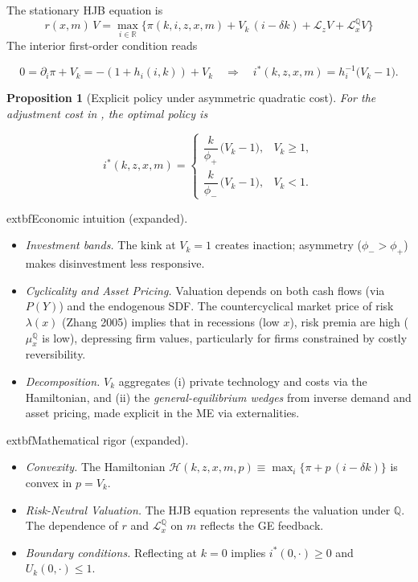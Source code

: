 \documentclass[11pt,letterpaper,oneside]{article}
\providecommand{\ac}[1]{#1}%
\newtheorem{propositionT}{Proposition}
\newenvironment{proposition}[2]{\begin{propositionT}[#1]\label{prop:#2}}{\end{propositionT}}
\newcommand{\R}{\mathbb{R}}
\newcommand{\Lz}{\mathcal{L}_z}
\newcommand{\LxQ}{\mathcal{L}_x^{\mathbb{Q}}}
\newcommand{\muxQ}{\mu_x^{\mathbb{Q}}}
\begin{document}
The stationary \ac{HJB} equation is
\begin{equation}
\boxed{\; r(x,m)\,V
  = \max_{i\in\R} \Big\{ \pi(k,i,z,x,m) + V_k\,(i-\delta k) + \Lz V + \LxQ V \Big\} \;}
\tag{HJB}\label{eq:HJB}
\end{equation}
The interior first-order condition reads

$$
0=\partial_i\pi+V_k=-(1+h_i(i,k))+V_k
\quad\Longrightarrow\quad
i^*(k,z,x,m)=h_i^{-1}\!\big(V_k-1\big).
$$

\begin{proposition}{Explicit policy under asymmetric quadratic cost}{policy}
For the adjustment cost in , the optimal policy is

$$
i^*(k,z,x,m)=
\begin{cases}
\dfrac{k}{\phi_+}\,\big(V_k-1\big), & V_k\ge 1,\\[6pt]
\dfrac{k}{\phi_-}\,\big(V_k-1\big), & V_k< 1.
\end{cases}
$$
\end{proposition}

\begin{tcolorbox}[didacticstyle]
      extbf{Economic intuition (expanded).}
\begin{itemize}[leftmargin=1.15em,itemsep=0.25em]
  \item \emph{Investment bands.} The kink at $V_k=1$ creates inaction; asymmetry ($\phi_->\phi_+$) makes disinvestment less responsive.
  \item \emph{Cyclicality and Asset Pricing.} Valuation depends on both cash flows (via $P(Y)$) and the endogenous SDF. The countercyclical market price of risk $\lambda(x)$ (Zhang 2005) implies that in recessions (low $x$), risk premia are high ($\muxQ$ is low), depressing firm values, particularly for firms constrained by costly reversibility.
  \item \emph{Decomposition.} $V_k$ aggregates (i) private technology and costs via the Hamiltonian, and (ii) the \emph{general-equilibrium wedges} from inverse demand and asset pricing, made explicit in the ME via externalities.
\end{itemize}
\end{tcolorbox}

\begin{tcolorbox}[mathstyle]
      extbf{Mathematical rigor (expanded).}
\begin{itemize}[leftmargin=1.15em,itemsep=0.25em]
  \item \emph{Convexity.} The Hamiltonian $\mathcal{H}(k,z,x,m,p)\equiv \max_{i}\{\pi+p\,(i-\delta k)\}$ is convex in $p=V_k$.
  \item \emph{Risk-Neutral Valuation.} The HJB equation represents the valuation under $\mathbb{Q}$. The dependence of $r$ and $\LxQ$ on $m$ reflects the GE feedback.
  \item \emph{Boundary conditions.} Reflecting at $k=0$ implies $i^*(0,\cdot)\ge0$ and $U_k(0,\cdot)\le1$.
\end{itemize}
\end{tcolorbox}
\end{document}
